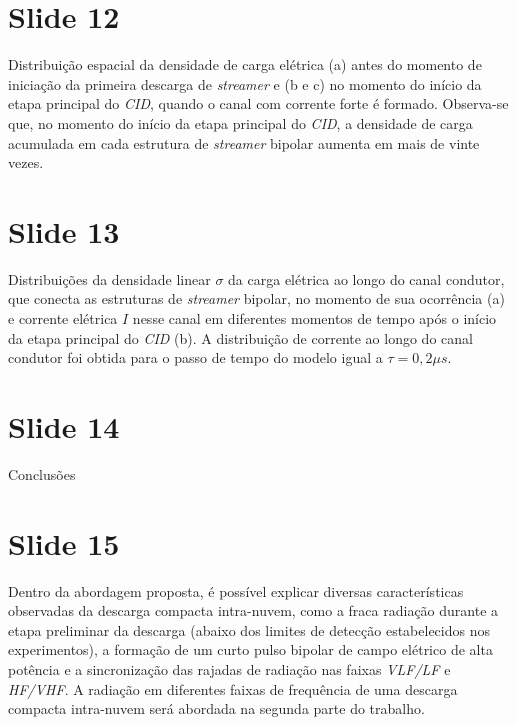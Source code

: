 \documentclass[a4paper, 12pt, onecolumn,singlespacing]{article}
\begin{document}
	\section{Slide 12}
	
		Distribuição espacial da densidade de carga elétrica (a) antes do momento de iniciação da primeira descarga de \textit{streamer} e (b e c) no momento do início da etapa principal do \textit{CID}, quando o canal com corrente forte é formado. Observa-se que, no momento do início da etapa principal do \textit{CID}, a densidade de carga acumulada em cada estrutura de \textit{streamer} bipolar aumenta em mais de vinte vezes.
	
	\section{Slide 13}
	
		Distribuições da densidade linear $\sigma$ da carga elétrica ao longo do canal condutor, que conecta as estruturas de \textit{streamer} bipolar, no momento de sua ocorrência (a) e corrente elétrica $I$ nesse canal em diferentes momentos de tempo após o início da etapa principal do \textit{CID} (b). A distribuição de corrente ao longo do canal condutor foi obtida para o passo de tempo do modelo igual a $\tau = 0,2 \mu s$.
		
	\section{Slide 14}
	
		Conclusões
		
	\section{Slide 15}
	
		 Dentro da abordagem proposta, é possível explicar diversas características observadas da descarga compacta intra-nuvem, como a fraca radiação durante a etapa preliminar da descarga (abaixo dos limites de detecção estabelecidos nos experimentos), a formação de um curto pulso bipolar de campo elétrico de alta potência e a sincronização das rajadas de radiação nas faixas \textit{VLF/LF} e \textit{HF/VHF}. A radiação em diferentes faixas de frequência de uma descarga compacta intra-nuvem será abordada na segunda parte do trabalho.
	
\end{document}
